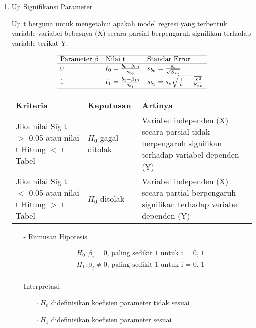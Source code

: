 \begin{enumerate}
\item Uji Signifikansi Parameter \\
\begin{sloppypar}
Uji t berguna untuk mengetahui apakah model regresi yang terbentuk variable-variabel bebasnya (X) secara parsial berpengaruh signifikan terhadap variable terikat Y.
\end{sloppypar}
$$\begin{array}{lll}
    \hline 
    \text{Parameter }\beta & \text {Nilai t} & \text {Standar Error} \\
    \hline 
    0 & t_0 = \frac{b_0 - \beta_{00}}{s_{b_0}} & s_{b_0} = \frac{s_e}{\sqrt{S_{xx}}} \\
    1 & t_1 = \frac{b_1 - \beta_{10}}{s_{b_1}} & s_{b_1} = s_e \sqrt{\frac{1}{n} + \frac{\overline{X^2}}{S_{xx}}} \\
    \hline
\end{array}$$
\begin{table}[h!]
    \begin{tabular}{p{4cm} p{2.5cm} p{6cm}}
        \toprule
\textbf{Kriteria} & \textbf{Keputusan} & \textbf{Artinya} \\ 
\midrule
Jika nilai Sig t $>$ 0.05 atau nilai t Hitung $<$ t Tabel
& $H_0$ gagal ditolak 
& Variabel independen (X) secara parsial tidak berpengaruh signifikan terhadap variabel dependen (Y) \\     
Jika nilai Sig t $<$ 0.05 atau nilai t Hitung $>$ t Tabel
& $H_0$ ditolak       
& Variabel independen (X) secara partial berpengaruh signifikan terhadap variabel dependen (Y) \\
        \bottomrule
    \end{tabular}
\end{table}
\begin{test}{
    \begin{enumerate}
    \item[-] Rumusan Hipotesis \\
    \begin{fleqn}[\parindent]
        \begin{equation*}
        \begin{split}
        &H_0 : \beta_i = 0 \text{, paling sedikit 1 untuk i = 0, 1} \\ 
        &H_1 : \beta_i \neq 0 \text{, paling sedikit 1 untuk i = 0, 1}\\
        \end{split}
        \end{equation*}
    \end{fleqn}
    Interpretasi:
    \begin{enumerate}
    \item[$\square$] $H_0$ didefinisikan koefisien parameter tidak sesuai
    \item[$\square$] $H_1$ didefinisikan koefisien parameter sesuai
    \end{enumerate}


\end{enumerate}}
\end{test}
\end{enumerate}
